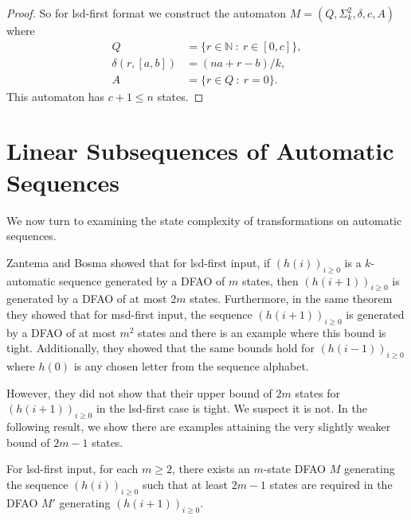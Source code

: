 \documentclass[12pt,reqno]{article}
\def\suchthat{\ : \ }
\begin{document}
\begin{proof}
    So for lsd-first format we construct the automaton $M=(Q, \Sigma_k^2, \delta, c, A)$ where 
    \begin{align*}
        Q& =\{r\in \mathbb{N} \suchthat r \in [0, c]\}, \\
        \delta(r, [a, b]) & = (na + r - b)/k, \\
        A &= \{r \in Q \suchthat r =0\}.
    \end{align*}
    This automaton has $c+1 \leq n$ states.

\end{proof}




\section{Linear Subsequences of Automatic Sequences} \label{section:linear-subsequences}

We now turn to examining the state complexity of transformations on automatic sequences.

Zantema and Bosma \cite[Theorem 16]{zantema_complexity_2022} showed that for lsd-first input, if $(h(i))_{i \geq 0}$ is a $k$-automatic sequence generated by a DFAO of $m$ states, then $(h(i+1))_{i \geq 0}$ is generated by a DFAO of at most $2m$ states. Furthermore, in the same theorem they showed that for msd-first input, the sequence $(h(i+1))_{i \geq 0}$ is generated by a DFAO of at most $m^2$ states and there is an example where this bound is tight. 
Additionally, they \cite[Theorem 17]{zantema_complexity_2022} showed that the same bounds hold for $(h(i-1))_{i \geq 0}$ where $h(0)$ is any chosen letter from the sequence alphabet.

However, they did not show that their upper bound of $2m$ states for 
$(h(i+1))_{i \geq 0}$ in the lsd-first case is tight.  We suspect it is not.  In the following result, we show there are examples attaining the very slightly weaker bound of $2m-1$ states.
\begin{theorem} \label{theorem:h(i+1)-sc-lowerbound}
    For lsd-first input, for each $m \geq 2$, 
    there exists an $m$-state DFAO $M$ generating the sequence $(h(i))_{i \geq 0}$ such that at least $2m-1$ states are required in the DFAO $M'$ generating $(h(i+1))_{i \geq 0}$. 
\end{theorem}
\end{document}
